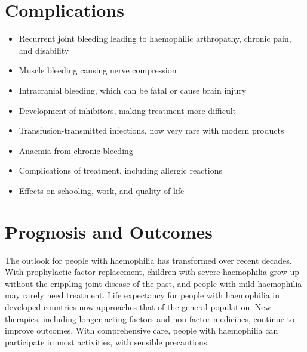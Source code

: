 \section*{Complications}
\begin{itemize}
    \item Recurrent joint bleeding leading to haemophilic arthropathy, chronic pain, and disability
    \item Muscle bleeding causing nerve compression
    \item Intracranial bleeding, which can be fatal or cause brain injury
    \item Development of inhibitors, making treatment more difficult
    \item Transfusion-transmitted infections, now very rare with modern products
    \item Anaemia from chronic bleeding
    \item Complications of treatment, including allergic reactions
    \item Effects on schooling, work, and quality of life
\end{itemize}

\section*{Prognosis and Outcomes}
The outlook for people with haemophilia has transformed over recent decades. With prophylactic factor replacement, children with severe haemophilia grow up without the crippling joint disease of the past, and people with mild haemophilia may rarely need treatment. Life expectancy for people with haemophilia in developed countries now approaches that of the general population. New therapies, including longer-acting factors and non-factor medicines, continue to improve outcomes. With comprehensive care, people with haemophilia can participate in most activities, with sensible precautions.

